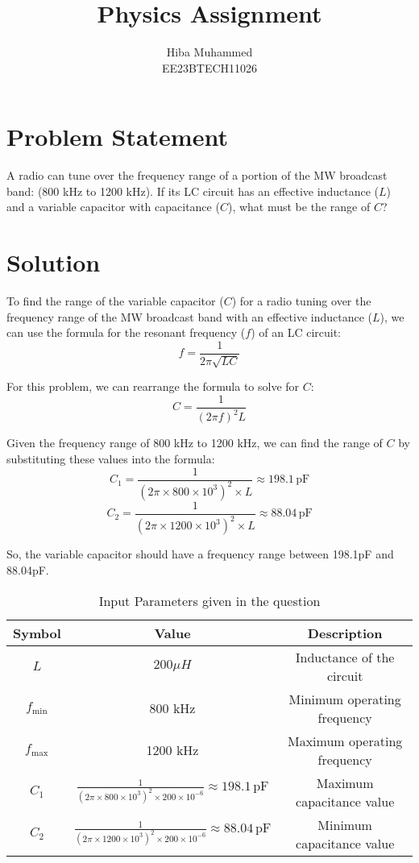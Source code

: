 \documentclass[12pt]{article}
\title{Physics Assignment}
\author{Hiba Muhammed \\
          EE23BTECH11026}
\begin{document}
    \maketitle

    \section*{Problem Statement}
    A radio can tune over the frequency range of a portion of the MW broadcast band: (800 kHz to 1200 kHz). If its LC circuit has an effective inductance (\(L\)) and a variable capacitor with capacitance (\(C\)), what must be the range of \(C\)?

    \section*{Solution}
    To find the range of the variable capacitor (\(C\)) for a radio tuning over the frequency range of the MW broadcast band with an effective inductance (\(L\)), we can use the formula for the resonant frequency (\(f\)) of an LC circuit:
    \[ f = \frac{1}{2\pi\sqrt{LC}} \]

    For this problem, we can rearrange the formula to solve for \(C\):
    \[ C = \frac{1}{(2\pi f)^2L} \]

    Given the frequency range of 800 kHz to 1200 kHz, we can find the range of \(C\) by substituting these values into the formula:
    \[ C_1 = \frac{1}{(2\pi \times 800 \times 10^3)^2 \times L} \approx 198.1 \, \text{pF} \]
    \[ C_2 = \frac{1}{(2\pi \times 1200 \times 10^3)^2 \times L} \approx 88.04 \, \text{pF} \]

    So, the variable capacitor should have a frequency range between 198.1pF and 88.04pF.

    \begin{table}[h]
      \centering
      \caption{Input Parameters given in the question}
      \label{tab:parameters}
      \begin{tabular}{|c|c|c|}
        \hline
        \textbf{Symbol} & \textbf{Value} & \textbf{Description} \\
        \hline
        \(L\) & \(200 \mu H\) & Inductance of the circuit \\
        \(f_{\text{min}}\) & 800 kHz & Minimum operating frequency \\
        \(f_{\text{max}}\) & 1200 kHz & Maximum operating frequency \\
        \(C_1\) &  \(\frac{1}{(2\pi \times 800 \times 10^3)^2 \times 200 \times 10^{-6}} \approx 198.1 \, \text{pF}\) & Maximum capacitance value \\
        \(C_2\) & \(\frac{1}{(2\pi \times 1200 \times 10^3)^2 \times 200 \times 10^{-6}} \approx 88.04 \, \text{pF}\) & Minimum capacitance value \\
        \hline
      \end{tabular}
    \end{table}
\end{document}
